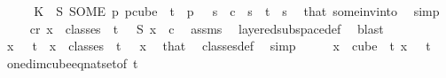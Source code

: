 \begin{isabellebody}
\ \ \isamarkupfalse%
\ \isamarkupfalse%
\ K{}{\isacharcolon}{\kern0pt}\ {\isachardoublequoteopen}{\isasymchi}\ {\isacharparenleft}{\kern0pt}S\ {\isacharparenleft}{\kern0pt}SOME\ p{\isachardot}{\kern0pt}\ p{\isasymin}cube\ {}\ {\isacharparenleft}{\kern0pt}t{\isacharplus}{\kern0pt}{}{\isacharparenright}{\kern0pt}\ {\isasymand}\ p\ {}\ {\isacharequal}{\kern0pt}\ s{\isacharparenright}{\kern0pt}{\isacharparenright}{\kern0pt}\ {\isacharequal}{\kern0pt}\ c{}{\isachardoublequoteclose}\ \ {\isachardoublequoteopen}s\ {\isacharless}{\kern0pt}\ t{\isachardoublequoteclose}\ \ s\ \isamarkupfalse%
\ that\ some{\isacharunderscore}{\kern0pt}inv{\isacharunderscore}{\kern0pt}into{\isacharunderscore}{\kern0pt}{}\ \isamarkupfalse%
\ simp\isanewline
\isanewline
\ \ \isamarkupfalse%
\ {\isacharasterisk}{\kern0pt}{\isacharcolon}{\kern0pt}\ {\isachardoublequoteopen}{\isasymexists}c{\isacharless}{\kern0pt}r{\isachardot}{\kern0pt}\ {\isasymforall}x\ {\isasymin}\ classes\ {}\ t\ {}{\isachardot}{\kern0pt}\ {\isasymchi}\ {\isacharparenleft}{\kern0pt}S\ x{\isacharparenright}{\kern0pt}\ {\isacharequal}{\kern0pt}\ c{\isachardoublequoteclose}\ \isamarkupfalse%
\ assms{\isacharparenleft}{\kern0pt}{}{\isacharparenright}{\kern0pt}\ \isamarkupfalse%
\ layered{\isacharunderscore}{\kern0pt}subspace{\isacharunderscore}{\kern0pt}def\ \isamarkupfalse%
\ blast\isanewline
\isanewline
\ \ \isamarkupfalse%
\ {\isachardoublequoteopen}x\ {}\ {\isacharequal}{\kern0pt}\ t{\isachardoublequoteclose}\ \ {\isachardoublequoteopen}x\ {\isasymin}\ classes\ {}\ t\ {}{\isachardoublequoteclose}\ \ x\ \isamarkupfalse%
\ that\ \isamarkupfalse%
\ classes{\isacharunderscore}{\kern0pt}def\ \isamarkupfalse%
\ simp\isanewline
\ \ \isamarkupfalse%
\ \isamarkupfalse%
\ {\isachardoublequoteopen}{\isasymexists}{\isacharbang}{\kern0pt}x\ {\isasymin}\ cube\ {}\ {\isacharparenleft}{\kern0pt}t{\isacharplus}{\kern0pt}{}{\isacharparenright}{\kern0pt}{\isachardot}{\kern0pt}\ x\ {}\ {\isacharequal}{\kern0pt}\ t{\isachardoublequoteclose}\ \isamarkupfalse%
\ one{\isacharunderscore}{\kern0pt}dim{\isacharunderscore}{\kern0pt}cube{\isacharunderscore}{\kern0pt}eq{\isacharunderscore}{\kern0pt}nat{\isacharunderscore}{\kern0pt}set{\isacharbrackleft}{\kern0pt}of\ {\isachardoublequoteopen}t{\isacharplus}{\kern0pt}{}{\isachardoublequoteclose}{\isacharbrackright}{\kern0pt}\ \isamarkupfalse%

\end{isabellebody}
